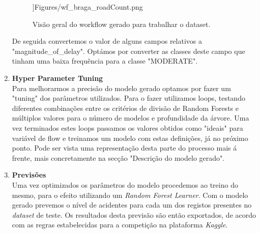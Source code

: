 \begin{enumerate}
\begin{figure}[H]
                ]{Figures/wf_braga_roadCount.png}
                \caption{Visão geral do workflow gerado para trabalhar o dataset.}
                \label{fig:"um"}
            \end{figure} 
            De seguida convertemos o valor de alguns campos relativos a "magnitude\_of\_delay". Optámos por converter as classes deste campo que tinham uma baixa frequência para a classe "MODERATE".
            
        \item \textbf{Hyper Parameter Tuning} \\
            Para melhorarmos a precisão do modelo gerado optamos por fazer um "tuning" dos parâmetros utilizados. Para o fazer utilizamos loops, testando diferentes combinações entre os critérios de divisão de Random Forests e múltiplos valores para o número de modelos e profundidade da árvore. Uma vez terminados estes loops passamos os valores obtidos como "ideais" para variável de flow e treinamos um modelo com estas definições, já no próximo ponto. Pode ser vista uma representação desta parte do processo mais á frente, mais concretamente na secção "Descrição do modelo gerado".
        
        \item \textbf{Previsões} \\
            Uma vez optimizados os parâmetros do modelo procedemos ao treino do mesmo, para o efeito utilizando um \textit{Random Forest Learner}. Com o modelo gerado prevemos o nível de acidentes para cada um dos registos presentes no \textit{dataset} de teste. Os resultados desta previsão são então exportados, de acordo com as regras estabelecidas para a competição na plataforma \textit{Kaggle}.
    \end{enumerate}
    
